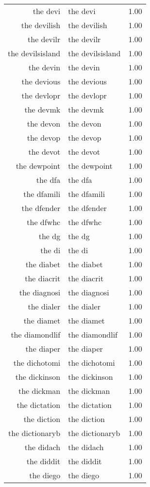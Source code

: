 \begin{table}[ht]
\begin{tabular}{rlr}
  the devi & the devi & 1.00 \\ 
  the devilish & the devilish & 1.00 \\ 
  the devilr & the devilr & 1.00 \\ 
  the devilsisland & the devilsisland & 1.00 \\ 
  the devin & the devin & 1.00 \\ 
  the devious & the devious & 1.00 \\ 
  the devlopr & the devlopr & 1.00 \\ 
  the devmk & the devmk & 1.00 \\ 
  the devon & the devon & 1.00 \\ 
  the devop & the devop & 1.00 \\ 
  the devot & the devot & 1.00 \\ 
  the dewpoint & the dewpoint & 1.00 \\ 
  the dfa & the dfa & 1.00 \\ 
  the dfamili & the dfamili & 1.00 \\ 
  the dfender & the dfender & 1.00 \\ 
  the dfwhc & the dfwhc & 1.00 \\ 
  the dg & the dg & 1.00 \\ 
  the di & the di & 1.00 \\ 
  the diabet & the diabet & 1.00 \\ 
  the diacrit & the diacrit & 1.00 \\ 
  the diagnosi & the diagnosi & 1.00 \\ 
  the dialer & the dialer & 1.00 \\ 
  the diamet & the diamet & 1.00 \\ 
  the diamondlif & the diamondlif & 1.00 \\ 
  the diaper & the diaper & 1.00 \\ 
  the dichotomi & the dichotomi & 1.00 \\ 
  the dickinson & the dickinson & 1.00 \\ 
  the dickman & the dickman & 1.00 \\ 
  the dictation & the dictation & 1.00 \\ 
  the diction & the diction & 1.00 \\ 
  the dictionaryb & the dictionaryb & 1.00 \\ 
  the didach & the didach & 1.00 \\ 
  the diddit & the diddit & 1.00 \\ 
  the diego & the diego & 1.00 \\ 

\end{tabular}
\end{table}
